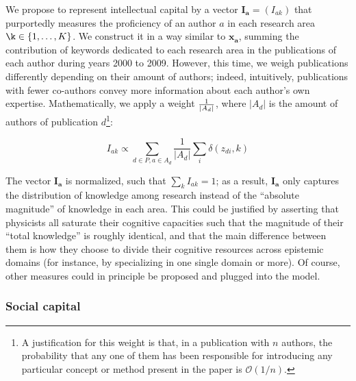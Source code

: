 \documentclass{article}
\begin{document}
We propose to represent intellectual capital by a vector $\bm{I_a}=(I_{ak})$ that purportedly measures the proficiency of an author $a$ in each research area $\k \in \{1,\dots,K\}$. We construct it in a way similar to $\bm{x_{a}}$, summing the contribution of keywords dedicated to each research area in the publications of each author during years 2000 to 2009. However, this time, we weigh publications differently depending on their amount of authors; indeed, intuitively, publications with fewer co-authors convey more information about each author's own expertise. Mathematically, we apply a weight $1 \over |A_d|$, where $|A_d|$ is the amount of authors of publication $d$\footnote{A justification for this weight is that, in a publication with $n$ authors, the probability that any one of them has been responsible for introducing any particular concept or method present in the paper is $\mathcal{O}(1/n)$. }:

\begin{equation}
    I_{ak} \propto  \sum_{d\in P,a\in A_d} \dfrac{1}{|A_d|}\sum_i \delta(z_{di},k)
\end{equation}

The vector $\bm{I_a}$ is normalized, such that $\sum_k I_{ak}=1$; as a result, $\bm{I_a}$ only captures the distribution of knowledge among research instead of the ``absolute magnitude'' of knowledge in each area. This could be justified by asserting that physicists all saturate their cognitive capacities such that the magnitude of their ``total knowledge'' is roughly identical, and that the main difference between them is how they choose to divide their cognitive resources across epistemic domains (for instance, by specializing in one single domain or more). Of course, other measures could in principle be proposed and plugged into the model. 

\subsubsection{Social capital}
\end{document}
